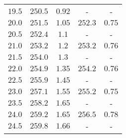 \begin{table}
\begin{tabular}{c c c c c}
        $\num{19.5}$&$\num{250.5}$&$\num{0.92}$&-&-\\
        $\num{20.0}$&$\num{251.5}$&$\num{1.05}$&$\num{252.3}$&$\num{0.75}$\\
        $\num{20.5}$&$\num{252.4}$&$\num{1.1}$&-&-\\
        $\num{21.0}$&$\num{253.2}$&$\num{1.2}$&$\num{253.2}$&$\num{0.76}$\\
        $\num{21.5}$&$\num{254.0}$&$\num{1.3}$&-&-\\
        $\num{22.0}$&$\num{254.9}$&$\num{1.35}$&$\num{254.2}$&$\num{0.76}$\\
        $\num{22.5}$&$\num{255.9}$&$\num{1.45}$&-&-\\
        $\num{23.0}$&$\num{257.1}$&$\num{1.55}$&$\num{255.2}$&$\num{0.75}$\\
        $\num{23.5}$&$\num{258.2}$&$\num{1.65}$&-&-\\
        $\num{24.0}$&$\num{259.2}$&$\num{1.65}$&$\num{256.5}$&$\num{0.78}$\\
        $\num{24.5}$&$\num{259.8}$&$\num{1.66}$&-&-\\  
        \bottomrule                                                                                                                                                                                                                                                                                                                                                                                                                                                                                                                                                                                                                                                      
    \end{tabular}
\end{table}
